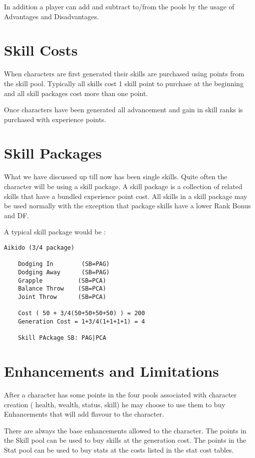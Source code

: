In addition a player can add and subtract to/from the pools by the 
usage of Advantages and Disadvantages.

\section{Skill Costs}

When characters are first generated their skills are purchased 
using points from the skill pool. Typically all skills cost 1 skill
point to purchase at the beginning and all skill packages cost more than
one point. 

Once characters have been generated all advancement and gain in skill
ranks is purchased with experience points.

\section{Skill Packages}

What we have discussed up till now has been single skills.
Quite often the character will be using a skill package.
A skill package is a collection of related 
skills that have a bundled experience point cost.
All skills in a skill package may be used normally with the 
exception that package skills have a lower Rank Bonus and DF.

A typical skill package would be :

\begin{verbatim}
Aikido (3/4 package)

	Dodging In		  (SB=PAG)
	Dodging Away	  (SB=PAG)
	Grapple			 (SB=PCA)
	Balance Throw	 (SB=PCA)
	Joint Throw		 (SB=PCA)

	Cost ( 50 + 3/4(50+50+50+50) ) = 200
	Generation Cost = 1+3/4(1+1+1+1) = 4

	Skill PAckage SB: PAG|PCA

\end{verbatim}

 

\section{Enhancements and Limitations}

After a character has some points in the four pools associated with 
character creation ( health, wealth, status, skill) he may choose to 
use them to buy Enhancements that will add flavour to the character. 

There are always the base enhancements allowed to the character. The
points in the Skill pool can be used to buy skills at the generation
cost. The points in the Stat pool can be used to buy stats at the costs
listed in the stat cost tables.

